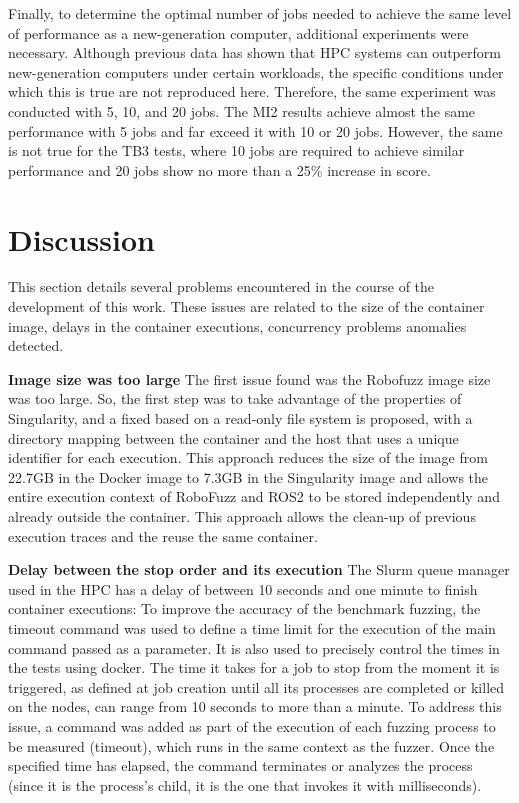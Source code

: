 \documentclass{svproc}
\begin{document}

Finally, to determine the optimal number of jobs needed to achieve the same level of performance as a new-generation computer, additional experiments were necessary. Although previous data has shown that HPC systems can outperform new-generation computers under certain workloads, the specific conditions under which this is true are not reproduced here. Therefore, the same experiment was conducted with 5, 10, and 20 jobs. 
The MI2 results achieve almost the same performance with 5 jobs and far exceed it with 10 or 20 jobs. However, the same is not true for the TB3 tests, where 10 jobs are required to achieve similar performance and 20 jobs show no more than a 25\% increase in score. 

\section{Discussion}
\label{sec:lessons}

This section details several problems encountered in the course of the development of this work. These issues are related to the size of the container image, delays in the container executions, concurrency problems anomalies detected.

\textbf{Image size was too large} \newline
The first issue found was the Robofuzz image size was too large. So, the first step was to take advantage of the properties of Singularity, and a fixed based on a read-only file system is proposed, with a directory mapping between the container and the host that uses a unique identifier for each execution. This approach reduces the size of the image from 22.7GB in the Docker image to 7.3GB in the Singularity image and allows the entire execution context of RoboFuzz and ROS2 to be stored independently and already outside the container. This approach allows the clean-up of previous execution traces and the reuse the same container. 


\textbf{Delay between the stop order and its execution} \newline
The Slurm queue manager used in the HPC has a delay of between 10 seconds and one minute to finish container executions: To improve the accuracy of the benchmark fuzzing, the timeout command was used to define a time limit for the execution of the main command passed as a parameter. It is also used to precisely control the times in the tests using docker.
The time it takes for a job to stop from the moment it is triggered, as defined at job creation until all its processes are completed or killed on the nodes, can range from 10 seconds to more than a minute. To address this issue, a command was added as part of the execution of each fuzzing process to be measured (timeout), which runs in the same context as the fuzzer. Once the specified time has elapsed, the command terminates or analyzes the process (since it is the process's child, it is the one that invokes it with milliseconds). 
\end{document}
